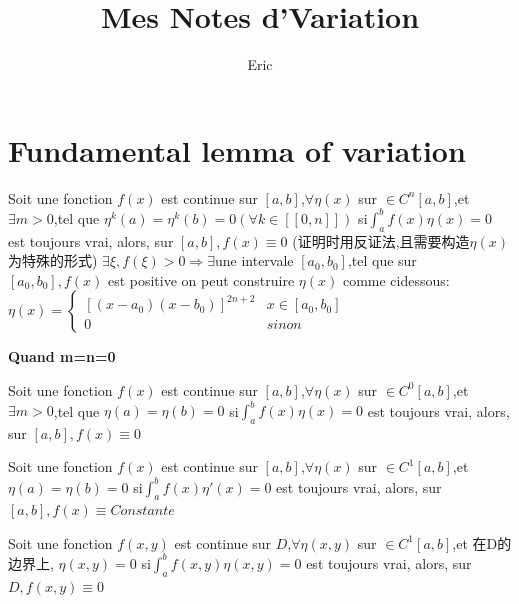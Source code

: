 \documentclass{article}
\begin{document}
\title{Mes Notes d'Variation}
\author{Eric}
\maketitle
\tableofcontents
\newpage

\section{Fundamental lemma of variation}
\begin{theorem}
    Soit une fonction $f(x)$ est continue sur $[a,b]$,$ \forall \eta(x)$ sur $\in C^{n}[a,b]$,et $\exists m>0$,tel que $\eta^{k}(a)=\eta^{k}(b)=0 (\forall k \in [[0,n]])$ \newline
    si$ \int_{a}^{b}f(x)\eta(x)=0$ est toujours vrai, \newline
    alors, sur $[a,b],f(x)\equiv 0$ \newline
    (证明时用反证法,且需要构造$\eta(x)$为特殊的形式)
    $\exists \xi,f(\xi)>0 \Rightarrow \exists $une intervale $[a_0,b_0]$,tel que sur $[a_0,b_0],f(x)$ est positive \newline
 on peut construire $\eta(x)$ comme cidessous:
$\eta(x)=
    \left\{
      \begin{array}{ll}
        [(x-a_0)(x-b_0)]^{2n+2} & x \in [a_0,b_0] \\
        0 & sinon
      \end{array}
    \right.
    $
\end{theorem}

\textbf{Quand m=n=0}
\begin{theorem}
    Soit une fonction $f(x)$ est continue sur $[a,b]$,$ \forall \eta(x)$ sur $\in C^{0}[a,b]$,et $\exists m>0$,tel que $\eta(a)=\eta(b)=0$ \newline
    si$ \int_{a}^{b}f(x)\eta(x)=0$ est toujours vrai, \newline
    alors, sur $[a,b],f(x)\equiv 0$
\end{theorem}

\begin{theorem}
    Soit une fonction $f(x)$ est continue sur $[a,b]$,$ \forall \eta(x)$ sur $\in C^{1}[a,b]$,et $\eta(a)=\eta(b)=0$ \newline
    si$ \int_{a}^{b}f(x)\eta'(x)=0$ est toujours vrai, \newline
    alors, sur $[a,b],f(x)\equiv Constante$
\end{theorem}

\begin{theorem}
    Soit une fonction $f(x,y)$ est continue sur $D$,$ \forall \eta(x,y)$ sur $\in C^{1}[a,b]$,et 在D的边界上, $\eta(x,y)=0$\newline
    si$ \int_{a}^{b}f(x,y)\eta(x,y)=0$ est toujours vrai, \newline
    alors, sur $D,f(x,y)\equiv 0$
\end{theorem}
\end{document}

